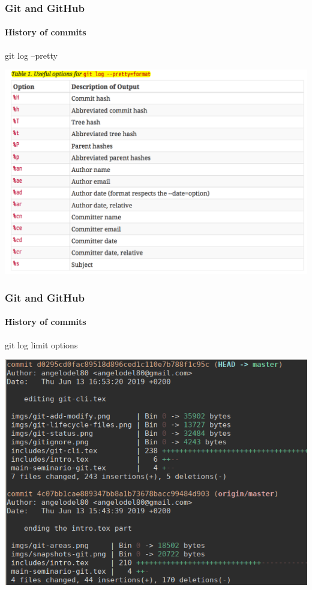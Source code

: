 \begin{frame}
	\frametitle{Git and GitHub}
    \framesubtitle{History of commits}
    \addtocounter{nframe}{1}

	\begin{block}{git log --pretty}
		\begin{center}
			\includegraphics[width=.9\textwidth]{imgs/git-log-pretty.png}
		\end{center}
	\end{block}

\end{frame}

\begin{frame}
	\frametitle{Git and GitHub}
    \framesubtitle{History of commits}
    \addtocounter{nframe}{1}

	\begin{block}{git log limit options}
		\begin{center}
			\includegraphics[width=.9\textwidth]{imgs/git-log-stats.png}
		\end{center}
	\end{block}

\end{frame}

